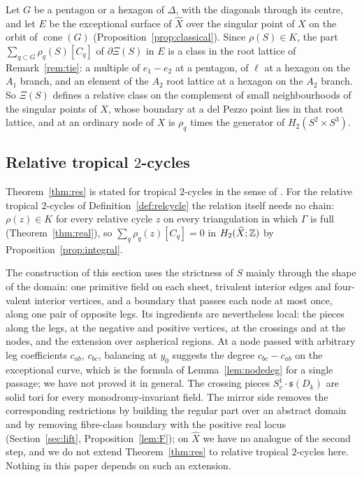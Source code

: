 \begin{remark}\label{rem:res-roots}
Let $G$ be a pentagon or a hexagon of $\Delta$, with the diagonals through its centre, and let $E$ be the exceptional surface
of $\widehat X$ over the singular point of $X$ on the orbit of $\operatorname{cone}(G)$ (Proposition~\ref{prop:classical}).
Since $\rho(S)\in K$, the part $\sum_{q\subset G}\rho_q(S)[C_q]$ of $\partial\Xi(S)$ in $E$ is a class in the root lattice of
Remark~\ref{rem:tie}: a multiple of $e_1-e_2$ at a pentagon, of $\ell$ at a hexagon on the $A_1$ branch, and an element of the
$A_2$ root lattice at a hexagon on the $A_2$ branch. So $\Xi(S)$ defines a relative class on the complement of small
neighbourhoods of the singular points of $X$, whose boundary at a del Pezzo point lies in that root lattice, and at an
ordinary node of $X$ is $\rho_q$ times the generator of $H_2(S^2\times S^3)$.
\end{remark}

\subsection{Relative tropical \texorpdfstring{$2$}{2}-cycles}\label{ssec:res-relative}
Theorem~\ref{thm:res} is stated for tropical $2$-cycles in the sense of \cite{CBM}. For the relative tropical $2$-cycles of
Definition~\ref{def:relcycle} the relation itself needs no chain: $\rho(z)\in K$ for every relative cycle $z$ on every
triangulation in which $\Gamma$ is full (Theorem~\ref{thm:real}), so $\sum_q\rho_q(z)[C_q]=0$ in $H_2(\widehat X;\mathbb Z)$ by
Proposition~\ref{prop:integral}.

\begin{remark}\label{rem:res-relative}
The construction of this section uses the strictness of $S$ mainly through the shape of the domain: one primitive field on each
sheet, trivalent interior edges and four-valent interior vertices, and a boundary that passes each node at most once, along one
pair of opposite legs. Its ingredients are nevertheless local: the pieces
along the legs, at the negative and positive vertices, at the crossings and at the nodes, and the extension over aspherical
regions. At a node passed with arbitrary leg coefficients $c_{ab}$, $c_{bc}$, balancing at $y_0$ suggests the degree
$c_{bc}-c_{ab}$ on the exceptional curve, which is the formula of Lemma~\ref{lem:nodedeg} for a single passage; we have not
proved it in general. The crossing pieces
$S^1_v\cdot\mathfrak s(D_k)$ are solid tori for every monodromy-invariant field. The mirror side removes the corresponding restrictions by building the regular part over an abstract domain and by
removing fibre-class boundary with the positive real locus (Section~\ref{sec:lift}, Proposition~\ref{lem:F}); on $\widehat X$ we
have no analogue of the second step, and we do not extend Theorem~\ref{thm:res} to relative tropical $2$-cycles here.
Nothing in this paper depends on such an extension.
\end{remark}

